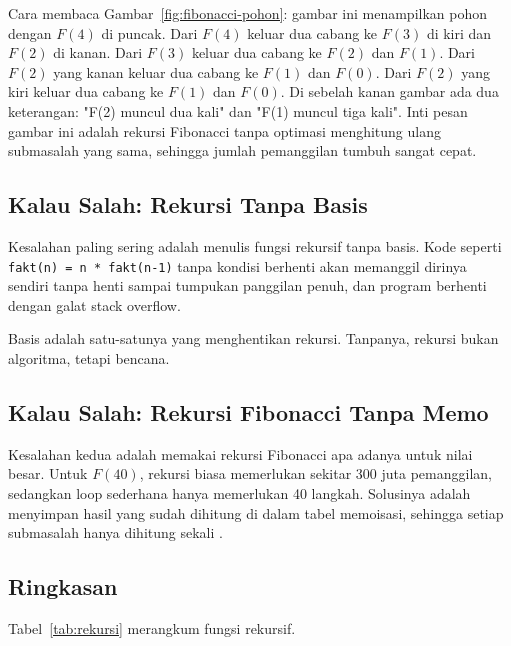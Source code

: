 \documentclass[11pt,a4paper]{article}
\begin{document}
Cara membaca Gambar~\ref{fig:fibonacci-pohon}: gambar ini menampilkan pohon dengan $F(4)$ di puncak. Dari $F(4)$ keluar dua cabang ke $F(3)$ di kiri dan $F(2)$ di kanan. Dari $F(3)$ keluar dua cabang ke $F(2)$ dan $F(1)$. Dari $F(2)$ yang kanan keluar dua cabang ke $F(1)$ dan $F(0)$. Dari $F(2)$ yang kiri keluar dua cabang ke $F(1)$ dan $F(0)$. Di sebelah kanan gambar ada dua keterangan: "F(2) muncul dua kali" dan "F(1) muncul tiga kali". Inti pesan gambar ini adalah rekursi Fibonacci tanpa optimasi menghitung ulang submasalah yang sama, sehingga jumlah pemanggilan tumbuh sangat cepat.

\subsection{Kalau Salah: Rekursi Tanpa Basis}

Kesalahan paling sering adalah menulis fungsi rekursif tanpa basis. Kode seperti \texttt{fakt(n)~=~n~*~fakt(n-1)} tanpa kondisi berhenti akan memanggil dirinya sendiri tanpa henti sampai tumpukan panggilan penuh, dan program berhenti dengan galat stack overflow.

Basis adalah satu-satunya yang menghentikan rekursi. Tanpanya, rekursi bukan algoritma, tetapi bencana.

\subsection{Kalau Salah: Rekursi Fibonacci Tanpa Memo}

Kesalahan kedua adalah memakai rekursi Fibonacci apa adanya untuk nilai besar. Untuk $F(40)$, rekursi biasa memerlukan sekitar 300 juta pemanggilan, sedangkan loop sederhana hanya memerlukan 40 langkah. Solusinya adalah menyimpan hasil yang sudah dihitung di dalam tabel memoisasi, sehingga setiap submasalah hanya dihitung sekali \cite{kleppmann}.

\subsection{Ringkasan}

Tabel~\ref{tab:rekursi} merangkum fungsi rekursif.
\end{document}
